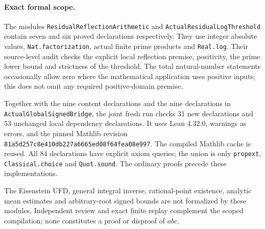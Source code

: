 \paragraph{Exact formal scope.}
The modules \texttt{ResidualReflection\allowbreak Arithmetic} and
\texttt{ActualResidual\allowbreak LogThreshold} contain seven and six proved
declarations respectively. They use integer absolute values,
\texttt{Nat.factorization}, actual finite prime products and
\texttt{Real.log}. Their source-level audit checks the explicit
local reflection premise, positivity, the prime lower bound and
strictness of the threshold. The total natural-number statements
occasionally allow zero where the mathematical application uses
positive inputs; this does not omit any required positive-domain premise.

Together with the nine content declarations and the nine declarations
in \texttt{ActualGlobal\allowbreak SignedBridge}, the joint fresh run checks
31 new declarations and 53 unchanged local dependency declarations.
It uses Lean 4.32.0, warnings as errors, and the pinned Mathlib revision
\texttt{81a5d257c8e410db227a6665ed08f64fea08e997}.
The compiled Mathlib cache is reused. All 84 declarations have explicit
axiom queries; the union is only \texttt{propext},
\texttt{Classical.choice} and \texttt{Quot.sound}.
The ordinary proofs precede these implementations.

The Eisenstein UFD, general integral inverse, rational-point existence,
analytic mean estimates and arbitrary-root signed bounds are not
formalized by these modules. Independent review and exact finite
replay complement the scoped compilation; none constitutes a proof
or disproof of $abc$.
